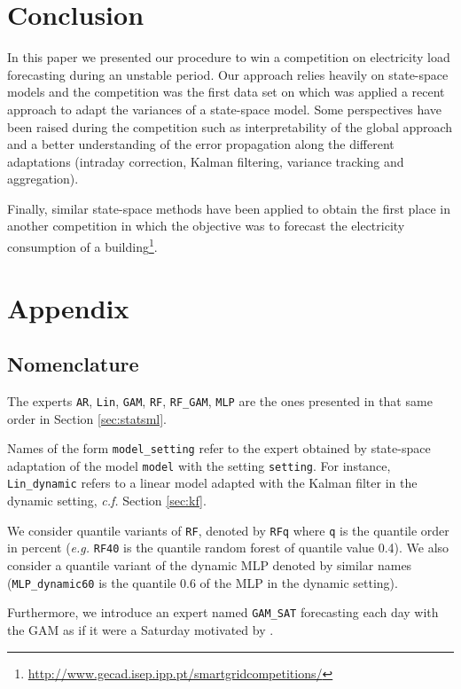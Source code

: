 \documentclass[transmag]{IEEEtran}
\begin{document}
\section{Conclusion}
In this paper we presented our procedure to win a competition on electricity load forecasting during an unstable period. Our approach relies heavily on state-space models and the competition was the first data set on which was applied a recent approach to adapt the variances of a state-space model. Some perspectives have been raised during the competition such as interpretability of the global approach and a better understanding of the error propagation along the different adaptations (intraday correction, Kalman filtering, variance tracking and aggregation).

Finally, similar state-space methods have been applied to obtain the first place in another competition in which the objective was to forecast the electricity consumption of a building\footnote{\href{http://www.gecad.isep.ipp.pt/smartgridcompetitions/}{http://www.gecad.isep.ipp.pt/smartgridcompetitions/}}.



\section*{Appendix}
\subsection{Nomenclature}
The experts \texttt{AR}, \texttt{Lin}, \texttt{GAM}, \texttt{RF}, \texttt{RF\_GAM}, \texttt{MLP} are the ones presented in that same order in Section \ref{sec:statsml}.

Names of the form \texttt{model\_setting} refer to the expert obtained by state-space adaptation of the model \texttt{model} with the setting \texttt{setting}. For instance, \texttt{Lin\_dynamic} refers to a linear model adapted with the Kalman filter in the dynamic setting, {\it c.f.} Section \ref{sec:kf}.

We consider quantile variants of \texttt{RF}, denoted by \texttt{RFq} where \texttt{q} is the quantile order in percent ({\it e.g.} \texttt{RF40} is the quantile random forest of quantile value 0.4). We also consider a quantile variant of the dynamic MLP denoted by similar names (\texttt{MLP\_dynamic60} is the quantile 0.6 of the MLP in the dynamic setting).

Furthermore, we introduce an expert named \texttt{GAM\_SAT} forecasting each day with the GAM as if it were a Saturday motivated by \cite{obst2021adaptive}.
\end{document}
